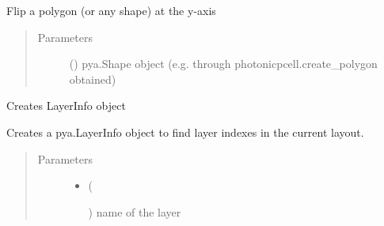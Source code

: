 \documentclass[a4paper,10pt,english]{sphinxmanual}
\begin{document}
\begin{fulllineitems}
\begin{fulllineitems}
\begin{quote}
\begin{description}
\end{description}\end{quote}

\end{fulllineitems}


\begin{fulllineitems}
\label{\detokenize{photonics/photonics:kppc.photonics.PhotDevice.flip_shape_yaxis}}
Flip a polygon (or any shape) at the y-axis
\begin{quote}\begin{description}
\item[{Parameters}] \leavevmode
{} () \textendash{} pya.Shape object (e.g. through photonicpcell.create\_polygon obtained)

\end{description}\end{quote}

\end{fulllineitems}


\begin{fulllineitems}
\label{\detokenize{photonics/photonics:kppc.photonics.PhotDevice.get_layer}}
Creates LayerInfo object

Creates a pya.LayerInfo object to find layer indexes in the current layout.
\begin{quote}\begin{description}
\item[{Parameters}] \leavevmode\begin{itemize}
\item {} 
 (%
\begin{footnote}[58]\sphinxAtStartFootnote
{}
%
\end{footnote}) \textendash{} name of the layer


\end{itemize}
\end{description}
\end{quote}
\end{fulllineitems}
\end{fulllineitems}
\end{document}
